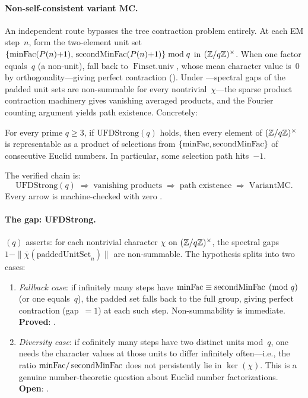 \paragraph{Non-self-consistent variant MC.}
An independent route bypasses the tree contraction problem entirely.
At each EM step~$n$, form the two-element unit set
$\{\mathrm{minFac}(P(n){+}1),\, \operatorname{secondMinFac}(P(n){+}1)\} \bmod q$
in $(\mathbb{Z}/q\mathbb{Z})^\times$.  When one factor equals~$q$
(a non-unit), fall back to $\operatorname{Finset.univ}$, whose
mean character value is~$0$ by orthogonality---giving perfect contraction
().
Under ---spectral gaps of the padded unit sets
are non-summable for every nontrivial~$\chi$---the
sparse product contraction machinery gives vanishing averaged
products, and the Fourier counting argument yields
path existence.  Concretely:

\begin{theorem}
\label{thm:variant-mc}
For every prime $q \geq 3$, if $\mathrm{UFDStrong}(q)$ holds, then
every element of $(\mathbb{Z}/q\mathbb{Z})^\times$ is representable as a product
of selections from $\{\mathrm{minFac},\operatorname{secondMinFac}\}$ of
consecutive Euclid numbers.  In particular, some selection path
hits~$-1$.
\end{theorem}

The verified chain is:
\[
  \mathrm{UFDStrong}(q)
  \;\Longrightarrow\;
  \text{vanishing products}
  \;\Longrightarrow\;
  \text{path existence}
  \;\Longrightarrow\;
  \text{VariantMC}.
\]
Every arrow is machine-checked with zero .

\paragraph{The gap: UFDStrong.}
$(q)$ asserts: for each nontrivial character
$\chi$ on $(\mathbb{Z}/q\mathbb{Z})^\times$, the spectral gaps
$1 - \|\bar\chi(\text{paddedUnitSet}_n)\|$ are non-summable.
The hypothesis splits into two cases:
\begin{enumerate}[nosep]
\item \emph{Fallback case}: if infinitely many steps have
  $\mathrm{minFac} \equiv \operatorname{secondMinFac} \pmod{q}$ (or one
  equals~$q$), the padded set falls back to the full group, giving
  perfect contraction (gap~$= 1$) at each such step.
  Non-summability is immediate.
  \textbf{Proved}:
  .
\item \emph{Diversity case}: if cofinitely many steps have two
  distinct units mod~$q$, one needs the character values at those
  units to differ infinitely often---i.e., the ratio
  $\mathrm{minFac}/\operatorname{secondMinFac}$ does not persistently lie in
  $\ker(\chi)$.  This is a genuine number-theoretic question about
  Euclid number factorizations.  \textbf{Open}:
  .
\end{enumerate}

